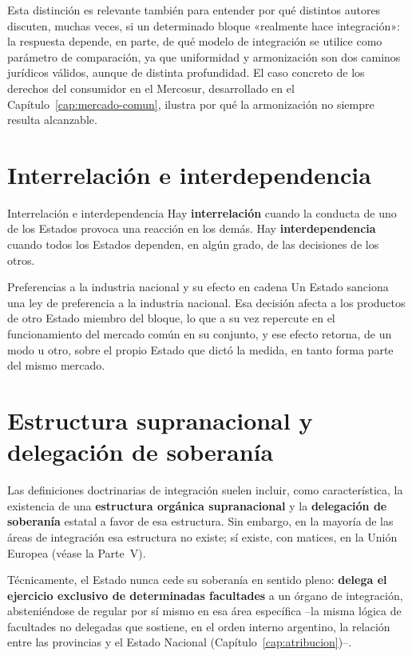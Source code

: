 \documentclass[12pt,oneside]{book}
\begin{document}
Esta distinción es relevante también para entender por qué distintos autores discuten, muchas veces, si un determinado bloque «realmente hace integración»: la respuesta depende, en parte, de qué modelo de integración se utilice como parámetro de comparación, ya que uniformidad y armonización son dos caminos jurídicos válidos, aunque de distinta profundidad. El caso concreto de los derechos del consumidor en el Mercosur, desarrollado en el Capítulo~\ref{cap:mercado-comun}, ilustra por qué la armonización no siempre resulta alcanzable.

\section{Interrelación e interdependencia}

\begin{definicion}{Interrelación e interdependencia}
Hay \textbf{interrelación} cuando la conducta de uno de los Estados provoca una reacción en los demás. Hay \textbf{interdependencia} cuando todos los Estados dependen, en algún grado, de las decisiones de los otros.
\end{definicion}

\begin{ejemplo}{Preferencias a la industria nacional y su efecto en cadena}
Un Estado sanciona una ley de preferencia a la industria nacional. Esa decisión afecta a los productos de otro Estado miembro del bloque, lo que a su vez repercute en el funcionamiento del mercado común en su conjunto, y ese efecto retorna, de un modo u otro, sobre el propio Estado que dictó la medida, en tanto forma parte del mismo mercado.
\end{ejemplo}

\section{Estructura supranacional y delegación de soberanía}

Las definiciones doctrinarias de integración suelen incluir, como característica, la existencia de una \textbf{estructura orgánica supranacional} y la \textbf{delegación de soberanía} estatal a favor de esa estructura. Sin embargo, en la mayoría de las áreas de integración esa estructura no existe; sí existe, con matices, en la Unión Europea (véase la Parte~V).

Técnicamente, el Estado nunca cede su soberanía en sentido pleno: \textbf{delega el ejercicio exclusivo de determinadas facultades} a un órgano de integración, absteniéndose de regular por sí mismo en esa área específica --la misma lógica de facultades no delegadas que sostiene, en el orden interno argentino, la relación entre las provincias y el Estado Nacional (Capítulo~\ref{cap:atribucion})--.
\end{document}
